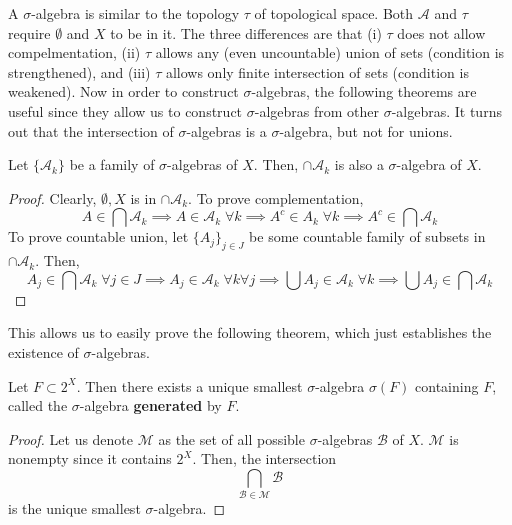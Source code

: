   A $\sigma$-algebra is similar to the topology $\tau$ of topological space. Both $\mathcal{A}$ and $\tau$ require $\emptyset$ and $X$ to be in it. The three differences are that (i) $\tau$ does not allow compelmentation, (ii) $\tau$ allows any (even uncountable) union of sets (condition is strengthened), and (iii) $\tau$ allows only finite intersection of sets (condition is weakened). Now in order to construct $\sigma$-algebras, the following theorems are useful since they allow us to construct $\sigma$-algebras from other $\sigma$-algebras. It turns out that the intersection of $\sigma$-algebras is a $\sigma$-algebra, but not for unions. 

  \begin{theorem}
    Let $\{\mathcal{A}_k\}$ be a family of $\sigma$-algebras of $X$. Then, $\cap \mathcal{A}_k$ is also a $\sigma$-algebra of $X$. 
  \end{theorem}
  \begin{proof}
    Clearly, $\emptyset, X$ is in $\cap \mathcal{A}_k$. To prove complementation, 
    \begin{equation}
      A \in \bigcap \mathcal{A}_k \implies A \in \mathcal{A}_k \; \forall k \implies A^c \in A_k \; \forall k \implies A^c \in \bigcap \mathcal{A}_k
    \end{equation}
    To prove countable union, let $\{A_j\}_{j \in J}$ be some countable family of subsets in $\cap \mathcal{A}_k$. Then, 
    \begin{equation}
      A_j \in \bigcap \mathcal{A}_k \; \forall j \in J \implies A_j \in \mathcal{A}_k \; \forall k \forall j \implies \bigcup A_j \in \mathcal{A}_k \; \forall k \implies \bigcup A_j \in \bigcap \mathcal{A}_k
    \end{equation}
  \end{proof}

  This allows us to easily prove the following theorem, which just establishes the existence of $\sigma$-algebras. 

  \begin{theorem}
    Let $F \subset 2^X$. Then there exists a unique smallest $\sigma$-algebra $\sigma(F)$ containing $F$, called the $\sigma$-algebra \textbf{generated} by $F$. 
  \end{theorem}
  \begin{proof}
    Let us denote $\mathcal{M}$ as the set of all possible $\sigma$-algebras $\mathcal{B}$ of $X$. $\mathcal{M}$ is nonempty since it contains $2^X$. Then, the intersection 
    \begin{equation}
      \bigcap_{\mathcal{B} \in \mathcal{M}} \mathcal{B}
    \end{equation}
    is the unique smallest $\sigma$-algebra. 
  \end{proof} 

